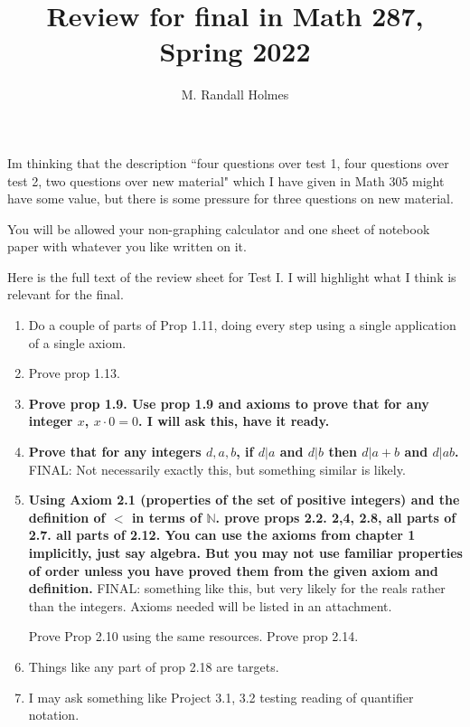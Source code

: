 \documentclass[12pt]{article}
\title{Review for final in Math 287, Spring 2022}
\author{M. Randall Holmes}
\begin{document}
\maketitle

Im thinking that the description ``four questions over test 1, four questions over test 2, two questions over new material" which I have given in Math 305 might have some value, but there is some pressure for three questions on new material.

You will be allowed your non-graphing calculator and one sheet of notebook paper with whatever you like written on it.

Here is the full text of the review sheet for Test I.  I will highlight what I think is relevant for the final.

\begin{enumerate}

\item  Do a couple of parts of Prop 1.11, doing every step using a single application of a single axiom.

\item  Prove prop 1.13.

\item {\bf  Prove prop 1.9.  Use prop 1.9 and axioms to prove that for any integer $x$, $x \cdot 0 = 0$.  I {\bf will} ask this, have it ready.}


\item  {\bf Prove that for any integers $d,a,b$, if $d|a$ and $d|b$ then $d|a+b$ and $d|ab$.}  FINAL:  Not necessarily exactly this, but something similar is likely.

\item  {\bf Using Axiom 2.1 (properties of the set of positive integers) and the definition of $<$ in terms of $\mathbb N$. prove
props 2.2. 2,4, 2.8, all parts of 2.7.  all parts of 2.12.  You can use the axioms from chapter 1 implicitly, just say algebra.  But you may not use familiar properties of order unless you have proved them from the given axiom and definition.}
FINAL:  something like this, but very likely for the reals rather than the integers.  Axioms needed will be listed in an attachment.

Prove Prop 2.10 using the same resources.  Prove prop 2.14.

\item  Things like any part of prop 2.18 are targets.

\item  I may ask something like Project 3.1, 3.2 testing reading of quantifier notation.


\end{enumerate}
\end{document}
